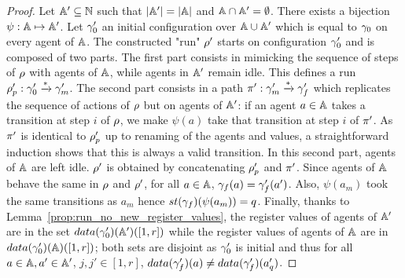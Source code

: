 \ifproofs
\begin{proof}
	Let $\mathbb{A}' \subseteq \mathbb{N}$ such that $|\mathbb{A}'|= |\mathbb{A}|$ and $\mathbb{A} \cap \mathbb{A}' = \emptyset$.
	There exists a bijection $\psi: \mathbb{A} \mapsto \mathbb{A}'$. Let $\gamma_0'$ an initial configuration over $\mathbb{A} \cup \mathbb{A}'$ which is equal to $\gamma_0$ on every agent of $\mathbb{A}$. 
	The constructed "run" $\rho'$ starts on configuration $\gamma_0'$ and is composed of two parts. 
	The first part consists in mimicking the sequence of steps of $\rho$ with agents of $\mathbb{A}$, while agents in $\mathbb{A}'$ remain idle. This defines a run $\rho_p' : \gamma_0' \xrightarrow{*}  \gamma_m'$.  
	The second part consists in a path $\pi': \gamma_m' \xrightarrow{*} \gamma_f'$ which replicates the sequence of actions of $\rho$ but on agents of $\mathbb{A}'$: if an agent $a \in \mathbb{A}$ takes a transition at step $i$ of $\rho$, we make $\psi(a)$ take that transition at step $i$ of $\pi'$. As $\pi'$ is identical to $\rho_p'$ up to renaming of the agents and values, a straightforward induction shows that this is always a valid transition.
	In this second part, agents of $\mathbb{A}$ are left idle. $\rho'$ is obtained by concatenating $\rho_p'$ and $\pi'$. Since agents of $\mathbb{A}$ behave the same in $\rho$ and $\rho'$, for all $a \in \mathbb{A}$, $\gamma_f(a) = \gamma_f'(a')$. Also, $\psi(a_m)$ took the same transitions as $a_m$ hence $\st{\config_f}(\psi(a_m)) = q$. Finally, thanks to Lemma~\ref{prop:run_no_new_register_values}, the register values of agents of $\mathbb{A}'$ are in the set $\data{\config_0'}(\agents')([1,r])$ while the register values of agents of $\mathbb{A}$ are in $\data{\config_0'}(\agents)([1,r])$; both sets are disjoint as $\gamma_0'$ is initial and thus for all $a \in \mathbb{A}, a' \in \mathbb{A}'$, $j,j' \in [1,r]$, $\data{\config_f'}(a) \ne \data{\config_f'}(a'_q)$.
\end{proof}
\fi

